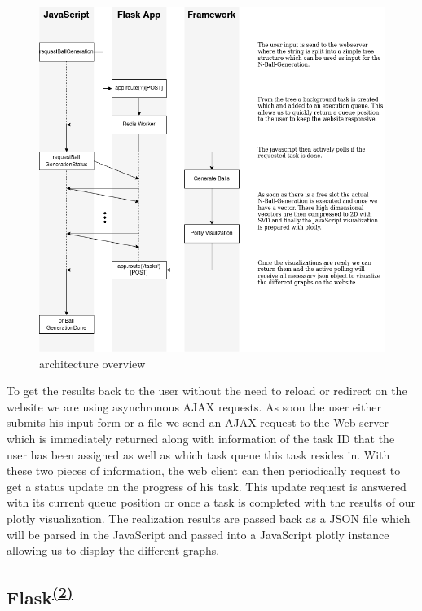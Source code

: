 \begin{figure}[H]
	\includegraphics[width=\textwidth]{res/overview.png}
	\caption{architecture overview}
	\label{fig:overview}
\end{figure}

To get the results back to the user without the need to reload or redirect on the website we are using asynchronous AJAX requests. As soon the user either submits his input form or a file we send an AJAX request to the Web server which is immediately returned along with information of the task ID that the user has been assigned as well as which task queue this task resides in. With these two pieces of information, the web client can then periodically request to get a status update on the progress of his task. This update request is answered with its current queue position or once a task is completed with the results of our plotly visualization. The realization results are passed back as a JSON file which will be parsed in the JavaScript and passed into a JavaScript plotly instance allowing us to display the different graphs.

\subsection[Flask]{Flask\textsuperscript{\hyperref[Oliver]{(2)}}}

